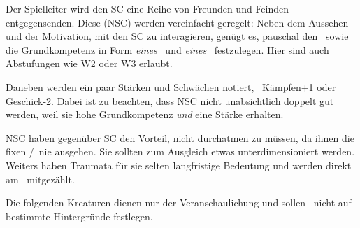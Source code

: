 {	

		\noindent
		Der Spielleiter wird den SC eine Reihe von Freunden und Feinden entgegensenden. Diese  (NSC) werden vereinfacht geregelt: Neben dem Aussehen und der Motivation, mit den SC zu interagieren, genügt es, pauschal den \HD\ sowie die Grundkompetenz in Form \emph{eines} \AD\ und \emph{eines} \RD\ festzulegen. Hier sind auch Abstufungen wie W2 oder W3 erlaubt.


		\noindent
		Daneben werden ein paar Stärken und Schwächen notiert, \zB\ Kämpfen+1 oder Geschick-2. Dabei ist zu beachten, dass NSC nicht unabsichtlich doppelt gut werden, weil sie hohe Grundkompetenz \emph{und} eine Stärke erhalten.

		NSC haben gegenüber SC den Vorteil, nicht durchatmen zu müssen, da ihnen die fixen \AD/\RD\ nie ausgehen. Sie sollten zum Ausgleich etwas unterdimensioniert werden. Weiters haben Traumata für sie selten langfristige Bedeutung und werden direkt am \HD\ mitgezählt.


		\noindent
		Die folgenden Kreaturen dienen nur der Veranschaulichung und sollen \nipajin\ nicht auf bestimmte Hintergründe festlegen.


}
